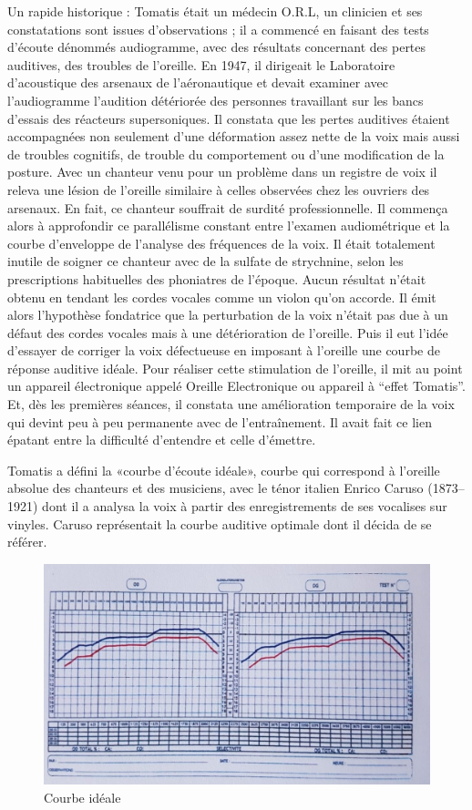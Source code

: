 Un rapide historique : Tomatis était un médecin O.R.L, un clinicien et  ses constatations
sont issues d'observations ; il a commencé en faisant
des tests d'écoute dénommés audiogramme, avec des résultats concernant  des pertes auditives, des troubles de l'oreille.
En 1947, il dirigeait le Laboratoire d'acoustique
des arsenaux de l'aéronautique et devait examiner avec l'audiogramme l'audition détériorée
des personnes travaillant sur les bancs d'essais des réacteurs supersoniques. Il constata que les pertes auditives étaient accompagnées non seulement  d'une
déformation assez nette de la voix mais aussi de troubles cognitifs, de trouble du comportement ou d'une modification de la posture. Avec
un chanteur venu pour un problème dans un registre de voix il releva une lésion de l'oreille similaire
à celles observées chez les ouvriers des arsenaux. En fait, ce chanteur
souffrait de surdité professionnelle. Il commença alors à approfondir
ce parallélisme constant entre l'examen audiométrique et la courbe
d'enveloppe de l'analyse des fréquences de la voix. Il était totalement
inutile de soigner ce chanteur avec de la sulfate de
strychnine, selon les prescriptions habituelles des phoniatres de
l'époque. Aucun résultat n'était obtenu en tendant les cordes vocales
comme un violon qu'on accorde. Il émit alors l'hypothèse fondatrice
que la perturbation de la voix n'était pas due à un défaut des cordes
vocales mais à une détérioration de l'oreille. Puis il eut l'idée
d'essayer de corriger la voix défectueuse en imposant à l'oreille
une courbe de réponse auditive idéale. Pour réaliser cette stimulation
de l'oreille, il mit au point un appareil électronique appelé Oreille
Electronique ou appareil à ``effet Tomatis''. Et, dès les premières
séances, il constata une amélioration temporaire de la voix qui devint
peu à peu permanente avec de l'entraînement. Il avait fait ce lien épatant entre la difficulté d'entendre et celle d'émettre.

Tomatis a défini la «courbe d'écoute idéale», courbe qui correspond à l'oreille absolue
des chanteurs et des musiciens,  avec  le ténor italien Enrico
Caruso (1873--1921) dont il a analysa la voix à partir des enregistrements
de ses vocalises sur vinyles. Caruso représentait la courbe auditive
optimale dont il décida de se référer.

\begin{figure}
	\centering
	\includegraphics[width=0.7\linewidth]{images/courbeideale.jpg}
	\caption{Courbe idéale}
	\label{fig:courbeideale}
      \end{figure}

